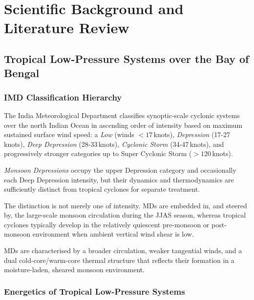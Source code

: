 
\ifpdf
\graphicspath{{chapters/Figs/}{chapters/Figs/Raster/}{Figs/PDF/}{Figs/}}
\else
\graphicspath{{chapters/Figs/}{chapters/Figs/Vector/}{Figs/}}
\fi

\chapter{Scientific Background and Literature Review}
\label{ch:background}
\section{Tropical Low-Pressure Systems over the Bay of Bengal}
\label{sec:lps_overview}
\subsection{IMD Classification Hierarchy}
\label{subsec:imd_classification}

The India Meteorological Department classifies synoptic-scale
cyclonic systems over the north Indian Ocean in ascending order of
intensity based on maximum sustained surface wind speed: a \emph{Low}
(winds $<17$\,knots), \emph{Depression} (17-27\,knots), \emph{Deep
Depression} (28-33\,knots), \emph{Cyclonic Storm} (34-47\,knots), and
progressively stronger categories up to Super Cyclonic Storm ($>120$\,knots).

\emph{Monsoon Depressions} occupy the upper Depression category and
occasionally each Deep Depression intensity, but their dynamics and
thermodynamics are sufficiently distinct from tropical cyclones for
separate treatment.

The distinction is not merely one of intensity. MDs are embedded in,
and steered by, the large-scale monsoon circulation during the JJAS
season, whereas tropical cyclones typically develop in the relatively
quiescent pre-monsoon or post-monsoon environment when ambient
vertical wind shear is low.

MDs are characterised by a broader circulation, weaker tangential
winds, and a dual cold-core/warm-core thermal structure
\autocite{rashid2005track} that reflects their formation in a
moisture-laden, sheared monsoon environment.

\subsection{Energetics of Tropical Low-Pressure Systems}
\label{subsec:lps_energetics}

